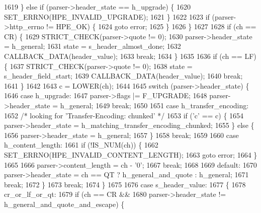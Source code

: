 \begin{DoxyCode}
1619           \} \textcolor{keywordflow}{else} \textcolor{keywordflow}{if} (parser->header_state == h_upgrade) \{
1620             SET_ERRNO(HPE_INVALID_UPGRADE);
1621           \}
1622 
1623           \textcolor{keywordflow}{if} (parser->http_errno != HPE_OK) \{
1624             \textcolor{keywordflow}{goto} error;
1625           \}
1626         \}
1627 
1628         \textcolor{keywordflow}{if} (ch == CR) \{
1629           STRICT_CHECK(parser->quote != 0);
1630           parser->header_state = h_general;
1631           state = s_header_almost_done;
1632           CALLBACK_DATA(header\_value);
1633           \textcolor{keywordflow}{break};
1634         \}
1635 
1636         \textcolor{keywordflow}{if} (ch == LF) \{
1637           STRICT_CHECK(parser->quote != 0);
1638           state = s_header_field_start;
1639           CALLBACK_DATA(header\_value);
1640           \textcolor{keywordflow}{break};
1641         \}
1642 
1643         c = LOWER(ch);
1644 
1645         \textcolor{keywordflow}{switch} (parser->header_state) \{
1646           \textcolor{keywordflow}{case} h_upgrade:
1647             parser->flags |= F_UPGRADE;
1648             parser->header_state = h_general;
1649             \textcolor{keywordflow}{break};
1650 
1651           \textcolor{keywordflow}{case} h_transfer_encoding:
1652             \textcolor{comment}{/* looking for 'Transfer-Encoding: chunked' */}
1653             \textcolor{keywordflow}{if} (\textcolor{charliteral}{'c'} == c) \{
1654               parser->header_state = h_matching_transfer_encoding_chunked;
1655             \} \textcolor{keywordflow}{else} \{
1656               parser->header_state = h_general;
1657             \}
1658             \textcolor{keywordflow}{break};
1659 
1660           \textcolor{keywordflow}{case} h_content_length:
1661             \textcolor{keywordflow}{if} (!IS_NUM(ch)) \{
1662               SET_ERRNO(HPE_INVALID_CONTENT_LENGTH);
1663               \textcolor{keywordflow}{goto} error;
1664             \}
1665 
1666             parser->content_length = ch - \textcolor{charliteral}{'0'};
1667             \textcolor{keywordflow}{break};
1668 
1669           \textcolor{keywordflow}{default}:
1670             parser->header_state = ch == QT ? h_general_and_quote : h_general;
1671             \textcolor{keywordflow}{break};
1672         \}
1673         \textcolor{keywordflow}{break};
1674       \}
1675 
1676       \textcolor{keywordflow}{case} s_header_value:
1677       \{
1678         cr\_or\_lf\_or\_qt:
1679         \textcolor{keywordflow}{if} (ch == CR &&
1680             parser->header_state != h_general_and_quote_and_escape) \{

\end{DoxyCode}
